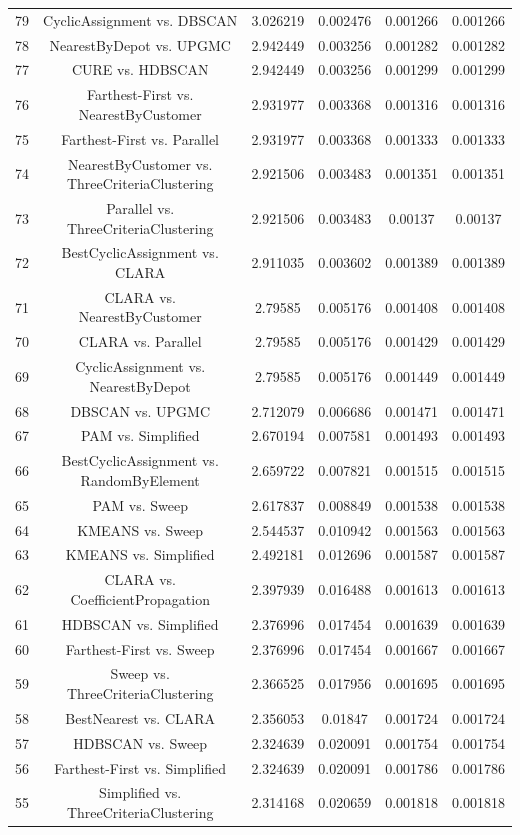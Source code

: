 \documentclass[a4paper,10pt]{article}
\begin{document}
\begin{landscape}
\begin{table}[!htp]
\begin{tabular}{cccccc}
79&CyclicAssignment vs. DBSCAN&3.026219&0.002476&0.001266&0.001266\\
78&NearestByDepot vs. UPGMC&2.942449&0.003256&0.001282&0.001282\\
77&CURE vs. HDBSCAN&2.942449&0.003256&0.001299&0.001299\\
76&Farthest-First vs. NearestByCustomer&2.931977&0.003368&0.001316&0.001316\\
75&Farthest-First vs. Parallel&2.931977&0.003368&0.001333&0.001333\\
74&NearestByCustomer vs. ThreeCriteriaClustering&2.921506&0.003483&0.001351&0.001351\\
73&Parallel vs. ThreeCriteriaClustering&2.921506&0.003483&0.00137&0.00137\\
72&BestCyclicAssignment vs. CLARA&2.911035&0.003602&0.001389&0.001389\\
71&CLARA vs. NearestByCustomer&2.79585&0.005176&0.001408&0.001408\\
70&CLARA vs. Parallel&2.79585&0.005176&0.001429&0.001429\\
69&CyclicAssignment vs. NearestByDepot&2.79585&0.005176&0.001449&0.001449\\
68&DBSCAN vs. UPGMC&2.712079&0.006686&0.001471&0.001471\\
67&PAM vs. Simplified&2.670194&0.007581&0.001493&0.001493\\
66&BestCyclicAssignment vs. RandomByElement&2.659722&0.007821&0.001515&0.001515\\
65&PAM vs. Sweep&2.617837&0.008849&0.001538&0.001538\\
64&KMEANS vs. Sweep&2.544537&0.010942&0.001563&0.001563\\
63&KMEANS vs. Simplified&2.492181&0.012696&0.001587&0.001587\\
62&CLARA vs. CoefficientPropagation&2.397939&0.016488&0.001613&0.001613\\
61&HDBSCAN vs. Simplified&2.376996&0.017454&0.001639&0.001639\\
60&Farthest-First vs. Sweep&2.376996&0.017454&0.001667&0.001667\\
59&Sweep vs. ThreeCriteriaClustering&2.366525&0.017956&0.001695&0.001695\\
58&BestNearest vs. CLARA&2.356053&0.01847&0.001724&0.001724\\
57&HDBSCAN vs. Sweep&2.324639&0.020091&0.001754&0.001754\\
56&Farthest-First vs. Simplified&2.324639&0.020091&0.001786&0.001786\\
55&Simplified vs. ThreeCriteriaClustering&2.314168&0.020659&0.001818&0.001818\\

\end{tabular}
\end{table}
\end{landscape}
\end{document}
